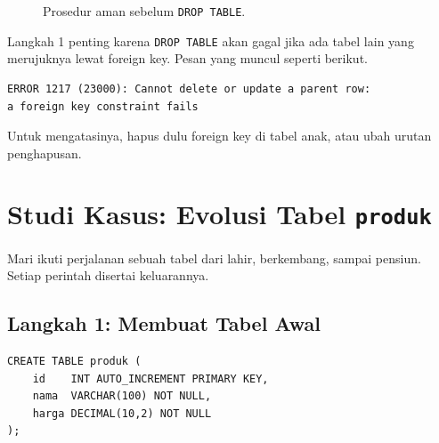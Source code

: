 \documentclass[11pt,a4paper]{article}
\begin{document}
\begin{figure}[H]
	\centering
	\caption{Prosedur aman sebelum \texttt{DROP TABLE}.}
	\label{fig:drop-safe}
\end{figure}

Langkah 1 penting karena \texttt{DROP TABLE} akan gagal jika ada tabel lain yang merujuknya lewat foreign key. Pesan yang muncul seperti berikut.

\begin{lstlisting}[style=out]
ERROR 1217 (23000): Cannot delete or update a parent row:
a foreign key constraint fails
\end{lstlisting}

Untuk mengatasinya, hapus dulu foreign key di tabel anak, atau ubah urutan penghapusan.

\section{Studi Kasus: Evolusi Tabel \texttt{produk}}

Mari ikuti perjalanan sebuah tabel dari lahir, berkembang, sampai pensiun. Setiap perintah disertai keluarannya.

\subsection{Langkah 1: Membuat Tabel Awal}

\begin{lstlisting}[style=code]
CREATE TABLE produk (
    id    INT AUTO_INCREMENT PRIMARY KEY,
    nama  VARCHAR(100) NOT NULL,
    harga DECIMAL(10,2) NOT NULL
);
\end{lstlisting}
\end{document}

